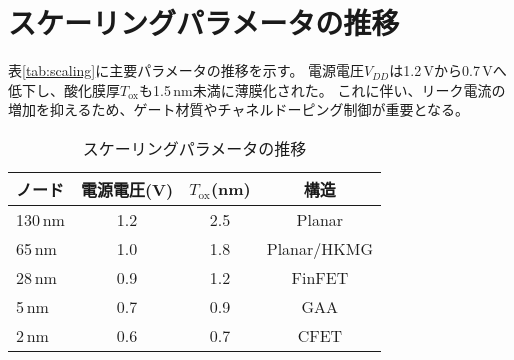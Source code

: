 \section{スケーリングパラメータの推移}
表\ref{tab:scaling}に主要パラメータの推移を示す。  
電源電圧$V_{DD}$は1.2\,Vから0.7\,Vへ低下し、酸化膜厚$T_\text{ox}$も1.5\,nm未満に薄膜化された。  
これに伴い、リーク電流の増加を抑えるため、ゲート材質やチャネルドーピング制御が重要となる。

\begin{table}[htbp]
\centering
\caption{スケーリングパラメータの推移}
\begin{tabular}{lccc}
\toprule
ノード & 電源電圧(V) & $T_\text{ox}$(nm) & 構造 \\
\midrule
130\,nm & 1.2 & 2.5 & Planar \\
65\,nm  & 1.0 & 1.8 & Planar/HKMG \\
28\,nm  & 0.9 & 1.2 & FinFET \\
5\,nm   & 0.7 & 0.9 & GAA \\
2\,nm   & 0.6 & 0.7 & CFET \\
\bottomrule
\end{tabular}
\end{table}
